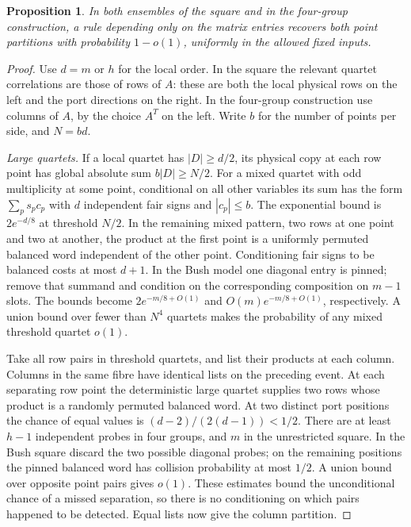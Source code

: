 \documentclass[11pt,reqno]{amsart}
\newtheorem{proposition}[theorem]{Proposition}
\theoremstyle{remark}\newtheorem{remark}[theorem]{Remark}
\begin{document}
\begin{proposition}\label{prop:recovery}
In both ensembles of the square and in the four-group construction, a rule depending only on the matrix entries recovers both point partitions with probability \(1-o(1)\), uniformly in the allowed fixed inputs.
\end{proposition}
\begin{proof}
Use \(d=m\) or \(h\) for the local order. In the square the relevant quartet correlations are those of rows of \(A\): these are both the local physical rows on the left and the port directions on the right. In the four-group construction use columns of \(A\), by the choice \(A^T\) on the left. Write \(b\) for the number of points per side, and \(N=bd\).

\emph{Large quartets.} If a local quartet has \(|D|\ge d/2\), its physical copy at each row point has global absolute sum \(b|D|\ge N/2\). For a mixed quartet with odd multiplicity at some point, conditional on all other variables its sum has the form \(\sum_p s_pc_p\) with \(d\) independent fair signs and \(|c_p|\le b\). The exponential bound is \(2e^{-d/8}\) at threshold \(N/2\). In the remaining mixed pattern, two rows at one point and two at another, the product at the first point is a uniformly permuted balanced word independent of the other point. Conditioning fair signs to be balanced costs at most \(d+1\). In the Bush model one diagonal entry is pinned; remove that summand and condition on the corresponding composition on \(m-1\) slots. The bounds become \(2e^{-m/8+O(1)}\) and \(O(m)e^{-m/8+O(1)}\), respectively. A union bound over fewer than \(N^4\) quartets makes the probability of any mixed threshold quartet \(o(1)\).

Take all row pairs in threshold quartets, and list their products at each column. Columns in the same fibre have identical lists on the preceding event. At each separating row point the deterministic large quartet supplies two rows whose product is a randomly permuted balanced word. At two distinct port positions the chance of equal values is \((d-2)/(2(d-1))<1/2\). There are at least \(h-1\) independent probes in four groups, and \(m\) in the unrestricted square. In the Bush square discard the two possible diagonal probes; on the remaining positions the pinned balanced word has collision probability at most \(1/2\). A union bound over opposite point pairs gives \(o(1)\). These estimates bound the unconditional chance of a missed separation, so there is no conditioning on which pairs happened to be detected. Equal lists now give the column partition.


\end{proof}
\end{document}
